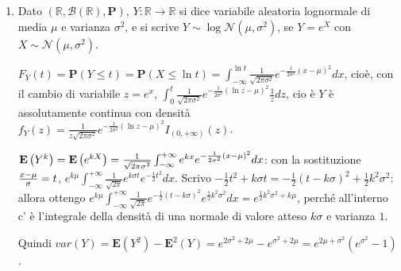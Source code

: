 \documentclass{article}
\begin{document}
\begin{enumerate}
\item Dato $\left( 
\mathbb{R}
,\mathcal{B}\left( 
\mathbb{R}
\right) ,\mathbf{P}\right) $, $Y:%
\mathbb{R}
\rightarrow 
\mathbb{R}
$ si dice variabile aleatoria lognormale di media $\mu $ e varianza $\sigma
^{2}$, e si scrive $Y\sim \log \mathcal{N}\left( \mu ,\sigma ^{2}\right) $,
se $Y=e^{X}$ con $X\sim \mathcal{N}\left( \mu ,\sigma ^{2}\right) $.

$F_{Y}\left( t\right) =\mathbf{P}\left( Y\leq t\right) =\mathbf{P}\left(
X\leq \ln t\right) =\int_{-\infty }^{\ln t}\frac{1}{\sqrt{2\pi \sigma ^{2}}}%
e^{-\frac{1}{2\sigma ^{2}}\left( x-\mu \right) ^{2}}dx$, cio\`{e}, con il
cambio di variabile $z=e^{x}$, $\int_{0}^{t}\frac{1}{\sqrt{2\pi \sigma ^{2}}}%
e^{-\frac{1}{2\sigma ^{2}}\left( \ln z-\mu \right) ^{2}}\frac{1}{z}dz$, cio%
\`{e} $Y$ \`{e} assolutamente continua con densit\`{a} $f_{Y}\left( z\right)
=\frac{1}{z\sqrt{2\pi \sigma ^{2}}}e^{-\frac{1}{2\sigma ^{2}}\left( \ln
z-\mu \right) ^{2}}I_{\left( 0,+\infty \right) }\left( z\right) $.

$\mathbf{E}\left( Y^{k}\right) =\mathbf{E}\left( e^{kX}\right) =\frac{1}{%
\sqrt{2\pi \sigma ^{2}}}\int_{-\infty }^{+\infty }e^{kx}e^{-\frac{1}{2\sigma
^{2}}\left( x-\mu \right) ^{2}}dx$: con la sostituzione $\frac{x-\mu }{%
\sigma }=t$, $e^{k\mu }\int_{-\infty }^{+\infty }\frac{1}{\sqrt{2\pi }}%
e^{k\sigma t}e^{-\frac{1}{2}t^{2}}dx$. Scrivo $-\frac{1}{2}t^{2}+k\sigma t=-%
\frac{1}{2}\left( t-k\sigma \right) ^{2}+\frac{1}{2}k^{2}\sigma ^{2}$:
allora ottengo $e^{k\mu }\int_{-\infty }^{+\infty }\frac{1}{\sqrt{2\pi }}e^{-%
\frac{1}{2}\left( t-k\sigma \right) ^{2}}e^{\frac{1}{2}k^{2}\sigma
^{2}}dx=e^{\frac{1}{2}k^{2}\sigma ^{2}+k\mu }$, perch\'{e} all'interno c'%
\`{e} l'integrale della densit\`{a} di una normale di valore atteso $k\sigma 
$ e varianza $1$.

Quindi $var\left( Y\right) =\mathbf{E}\left( Y^{2}\right) -\mathbf{E}%
^{2}\left( Y\right) =e^{2\sigma ^{2}+2\mu }-e^{\sigma ^{2}+2\mu }=e^{2\mu
+\sigma ^{2}}\left( e^{\sigma ^{2}}-1\right) $.


\end{enumerate}
\end{document}
